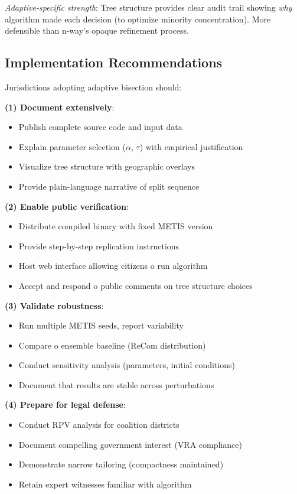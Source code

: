 \textit{Adaptive-specific strength}: Tree structure provides clear audit trail showing \textit{why} algorithm made each decision (to optimize minority concentration). More defensible than n-way's opaque refinement process.

\subsection{Implementation Recommendations}

Jurisdictions adopting adaptive bisection should:

\textbf{(1) Document extensively}:
\begin{itemize}
\item Publish complete source code and input data
\item Explain parameter selection ($\alpha$, $\tau$) with empirical justification
\item Visualize tree structure with geographic overlays
\item Provide plain-language narrative of split sequence
\end{itemize}

\textbf{(2) Enable public verification}:
\begin{itemize}
\item Distribute compiled binary with fixed METIS version
\item Provide step-by-step replication instructions
\item Host web interface allowing citizens 	o run algorithm
\item Accept and respond 	o public comments on tree structure choices
\end{itemize}

\textbf{(3) Validate robustness}:
\begin{itemize}
\item Run multiple METIS seeds, report variability
\item Compare 	o ensemble baseline (ReCom distribution)
\item Conduct sensitivity analysis (parameters, initial conditions)
\item Document that results are stable across perturbations
\end{itemize}

\textbf{(4) Prepare for legal defense}:
\begin{itemize}
\item Conduct RPV analysis for coalition districts
\item Document compelling government interest (VRA compliance)
\item Demonstrate narrow tailoring (compactness maintained)
\item Retain expert witnesses familiar with algorithm
\end{itemize}

